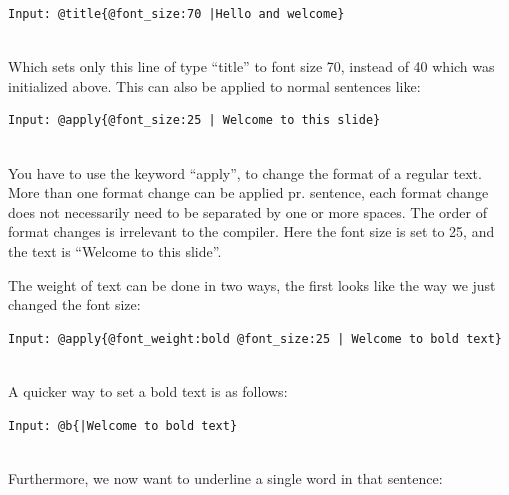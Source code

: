 \begin{lstlisting}[frame=single]
Input: @title{@font_size:70 |Hello and welcome}
\end{lstlisting}

 \\

Which sets only this line of type ``title'' to font size 70, instead of 40 which was initialized above.
This can also be applied to normal sentences like:\\

\begin{lstlisting}[frame=single]
Input: @apply{@font_size:25 | Welcome to this slide}
\end{lstlisting}

 \\

You have to use the keyword ``apply'', to change the format of a regular text. More than one format change can be applied pr. sentence, each format change does not necessarily need to be separated by one or more spaces. The order of format changes is irrelevant to the compiler. Here the font size is set to 25, and the text is ``Welcome to this slide''.

The weight of text can be done in two ways, the first looks like the way we just changed the font size:\\

\begin{lstlisting}[frame=single]
Input: @apply{@font_weight:bold @font_size:25 | Welcome to bold text}
\end{lstlisting}

 \\

A quicker way to set a bold text is as follows:\\

\begin{lstlisting}[frame=single]
Input: @b{|Welcome to bold text}
\end{lstlisting}

 \\

Furthermore, we now want to underline a single word in that sentence:\\


